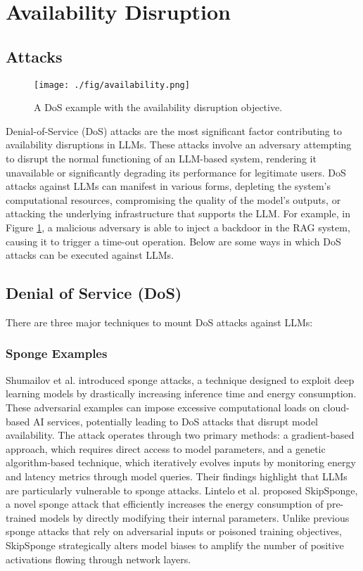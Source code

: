 \section{Availability Disruption} \label{sec:availability}

\subsection{Attacks}

\begin{figure}[h]
	\centering
	\texttt{[image: ./fig/availability.png]}
	\caption{A DoS example with the availability disruption objective.}
	\label{fig:availability}
\end{figure}

Denial-of-Service (DoS) attacks are the most significant factor contributing to availability disruptions in LLMs. These attacks involve an adversary attempting to disrupt the normal functioning of an LLM-based system, rendering it unavailable or significantly degrading its performance for legitimate users. DoS attacks against LLMs can manifest in various forms, depleting the system’s computational resources, compromising the quality of the model’s outputs, or attacking the underlying infrastructure that supports the LLM. For example, in Figure \ref{fig:availability}, a malicious adversary is able to inject a backdoor in the RAG system, causing it to trigger a time-out operation.
Below are some ways in which DoS attacks can be executed against LLMs.

\subsection{Denial of Service (DoS)}

There are three major techniques to mount DoS attacks against LLMs:

\subsubsection{Sponge Examples}

Shumailov et al. \cite{shumailov2021sponge} introduced sponge attacks, a technique designed to exploit deep learning models by drastically increasing inference time and energy consumption. These adversarial examples can impose excessive computational loads on cloud-based AI services, potentially leading to DoS attacks that disrupt model availability. The attack operates through two primary methods: a gradient-based approach, which requires direct access to model parameters, and a genetic algorithm-based technique, which iteratively evolves inputs by monitoring energy and latency metrics through model queries. Their findings highlight that LLMs are particularly vulnerable to sponge attacks. Lintelo et al. \cite{lintelo2024skipsponge} proposed SkipSponge, a novel sponge attack that efficiently increases the energy consumption of pre-trained models by directly modifying their internal parameters. Unlike previous sponge attacks that rely on adversarial inputs or poisoned training objectives, SkipSponge strategically alters model biases to amplify the number of positive activations flowing through network layers. 

